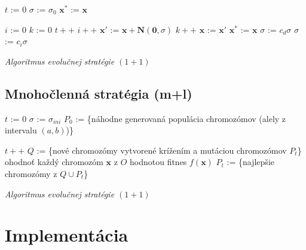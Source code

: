 \documentclass[12pt, a4paper]{article}
\providecommand{\dontprintsemicolon}{\DontPrintSemicolon}
\begin{document}
\begin{algorithm}[h]
	\dontprintsemicolon
	\BlankLine
	
	$t$ := $0$\;
	$\sigma$ := $\sigma_0$\;
	$\mathbf{x^*}$ := $\mathbf{x}$\;	
	
	{
		$i$ := $0$\;
		$k$ := $0$\;
		$t++$\;
		{
			$i++$\;
			$\mathbf{x'}$ := $\mathbf{x} + \mathbf{N}(\mathbf{0}, \sigma)$\;
			{
				$k++$\;
				$\mathbf{x}$ := $\mathbf{x'}$\;
				{
					$\mathbf{x^*}$ := $\mathbf{x}$\;	
				}
			}
			{
				$\sigma$ := $c_d\sigma$\;
			} 
			{
				$\sigma$ := $c_i\sigma$\;
			}
		}
	}

	\caption{\emph{Algoritmus evolučnej stratégie $(1+1)$} \cite{kvasnicka}\label{alg:evolution_single}}
\end{algorithm} 

\subsection{Mnohočlenná stratégia (m+l)}

\begin{algorithm}[h]
	\dontprintsemicolon
	\BlankLine
	
	$t$ := $0$\;
	$\sigma$ := $\sigma_{ini}$\;
	$P_0$ := \{náhodne generovaná populácia chromozómov (alely z intervalu $(a,b)$)\}\;
	
	{
		$t++$\;
		$Q$ := \{nové chromozómy vytvorené krížením a mutáciou chromozómov $P_t$\}\;
		ohodnoť každý chromozóm $\mathbf{x}$ z $O$ hodnotou fitnes $f(\mathbf{x})$\;
		$P_t$ := \{najlepšie chromozómy z $Q \cup P_t$\}\;
	}

	\caption{\emph{Algoritmus evolučnej stratégie $(1+1)$} \cite{kvasnicka}\label{alg:evolution_single}}
\end{algorithm} 

\section{Implementácia}
\end{document}

